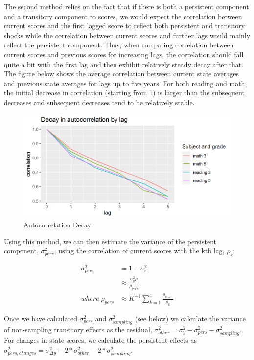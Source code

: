 \documentclass[
  11pt,
]{article}
\begin{document}
The second method relies on the fact that if there is both a persistent component and a transitory component to scores, we would expect the correlation between current scores and the first lagged score to reflect both persistent and transitory shocks while the correlation between current scores and further lags would mainly reflect the persistent component. Thus, when comparing correlation between current scores and previous scores for increasing lags, the correlation should fall quite a bit with the first lag and then exhibit relatively steady decay after that. The figure below shows the average correlation between current state averages and previous state averages for lags up to five years. For both reading and math, the initial decrease in correlation (starting from 1) is larger than the subsequent decreases and subsequent decreases tend to be relatively stable.

\begin{figure}

{\centering \includegraphics[width=0.8\linewidth]{Correlation decay} 

}

\caption{Autocorrelation Decay}\label{fig:decay}
\end{figure}

Using this method, we can then estimate the variance of the persistent component, \(\sigma^2_{pers}\), using the correlation of current scores with the kth lag, \(\rho_{k}\):

\[
\begin{aligned}
  \sigma^2_{pers} &= 1 - \sigma^2_{\epsilon} \\
  &\approx \frac{\sigma^2_{y}\rho}{\rho_{pers}} \\
  where \; \rho_{pers}  &\approx K^{-1}\sum_{k=1}^4\frac{\rho_{k+1}}{\rho_k}
\end{aligned}
\]

Once we have calculated \(\sigma^2_{pers}\) and \(\sigma^2_{sampling}\) (see below) we calculate the variance of non-sampling transitory effects as the residual, \(\sigma^2_{other} = \sigma^2_{y} - \sigma^2_{pers} - \sigma^2_{sampling}\). For changes in state scores, we calculate the persistent effects as \(\sigma^2_{pers,changes} = \sigma^2_{\Delta y}-2*\sigma^2_{other}-2*\sigma^2_{sampling}\).
\end{document}
